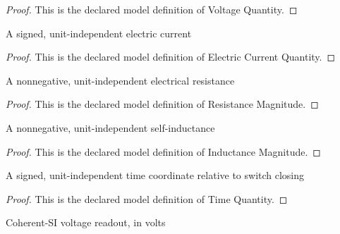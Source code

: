 \begin{proof}
  This is the declared model definition of Voltage Quantity.
\end{proof}
\begin{definition}
  \label{def:physics:phyx-mini-0986:phyxminiproblems-problemphyxmini0986-electriccurrentquantity}
  A signed, unit-independent electric current
\end{definition}
\begin{proof}
  This is the declared model definition of Electric Current Quantity.
\end{proof}
\begin{definition}
  \label{def:physics:phyx-mini-0986:phyxminiproblems-problemphyxmini0986-resistancemagnitude}
  A nonnegative, unit-independent electrical resistance
\end{definition}
\begin{proof}
  This is the declared model definition of Resistance Magnitude.
\end{proof}
\begin{definition}
  \label{def:physics:phyx-mini-0986:phyxminiproblems-problemphyxmini0986-inductancemagnitude}
  A nonnegative, unit-independent self-inductance
\end{definition}
\begin{proof}
  This is the declared model definition of Inductance Magnitude.
\end{proof}
\begin{definition}
  \label{def:physics:phyx-mini-0986:phyxminiproblems-problemphyxmini0986-timequantity}
  A signed, unit-independent time coordinate relative to switch closing
\end{definition}
\begin{proof}
  This is the declared model definition of Time Quantity.
\end{proof}
\begin{definition}
  \label{def:physics:phyx-mini-0986:phyxminiproblems-problemphyxmini0986-voltageinvolts}
  Coherent-SI voltage readout, in volts
\end{definition}
